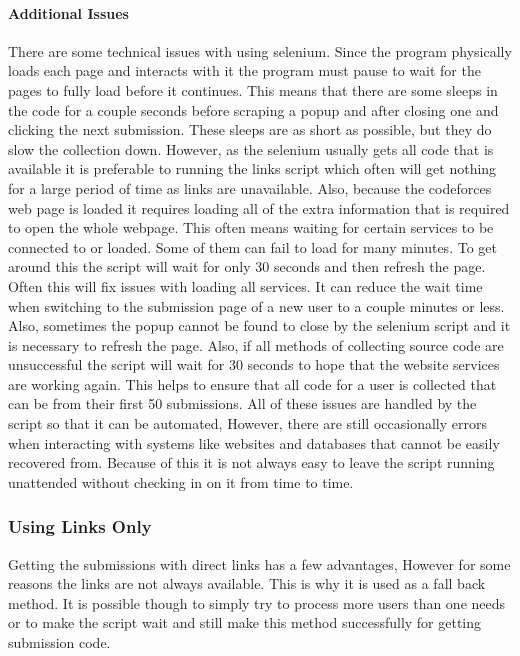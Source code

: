 \documentclass{article}
\begin{document}
\paragraph{Additional Issues}
There are some technical issues with using selenium. Since the program physically loads each page and interacts with it the program must pause to wait for the pages to fully load before it continues. This means that there are some sleeps in the code for a couple seconds before scraping a popup and after closing one and clicking the next submission. These sleeps are as short as possible, but they do slow the collection down. However, as the selenium usually gets all code that is available it is preferable to running the links script which often will get nothing for a large period of time as links are unavailable. Also, because the codeforces web page is loaded it requires loading all of the extra information that is required to open the whole webpage. This often means waiting for certain services to be connected to or loaded. Some of them can fail to load for many minutes. To get around this the script will wait for only 30 seconds and then refresh the page. Often this will fix issues with loading all services. It can reduce the wait time when switching to the submission page of a new user to a couple minutes or less. Also, sometimes the popup cannot be found to close by the selenium script and it is necessary to refresh the page. Also, if all methods of collecting source code are unsuccessful the script will wait for 30 seconds to hope that the website services are working again. This helps to ensure that all code for a user is collected that can be from their first 50 submissions. All of these issues are handled by the script so that it can be automated, However, there are still occasionally errors when interacting with systems like websites and databases that cannot be easily recovered from. Because of this it is not always easy to leave the script running unattended without checking in on it from time to time.


\subsubsection{Using Links Only}
Getting the submissions with direct links has a few advantages, However for some reasons the links are not always available. This is why it is used as a fall back method. It is possible though to simply try to process more users than one needs or to make the script wait and still make this method successfully for getting submission code.
\end{document}
